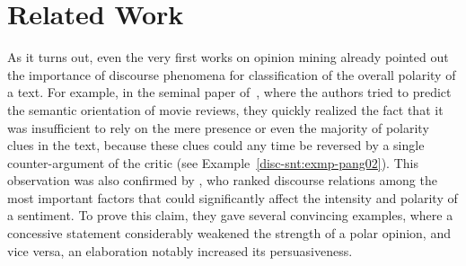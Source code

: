 \documentclass[11pt]{article}
\begin{document}
\begin{figure*}[htb!]\label{fig:rst-tree}
  
\end{figure*}



\section{Related Work}\label{relwork}



As it turns out, even the very first works on opinion mining already
pointed out the importance of discourse phenomena for classification
of the overall polarity of a text.  For example, in the seminal paper
of~, where the authors tried to predict the semantic
orientation of movie reviews, they quickly realized the fact that it
was insufficient to rely on the mere presence or even the majority of
polarity clues in the text, because these clues could any time be
reversed by a single counter-argument of the critic (see
Example~\ref{disc-snt:exmp-pang02}).  This observation was also
confirmed by , who ranked discourse relations among
the most important factors that could significantly affect the
intensity and polarity of a sentiment.  To prove this claim, they gave
several convincing examples, where a concessive statement considerably
weakened the strength of a polar opinion, and vice versa, an
elaboration notably increased its persuasiveness.
\end{document}
